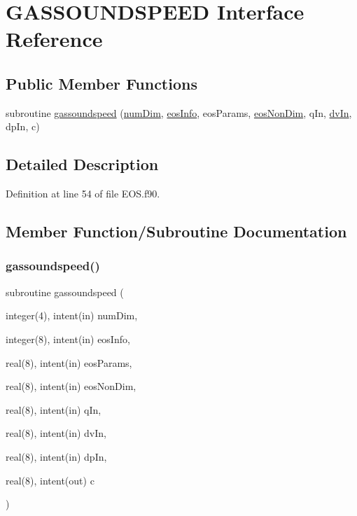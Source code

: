 \hypertarget{interfaceeos_1_1GASSOUNDSPEED}{}\section{G\+A\+S\+S\+O\+U\+N\+D\+S\+P\+E\+ED Interface Reference}
\label{interfaceeos_1_1GASSOUNDSPEED}
\subsection*{Public Member Functions}
\begin{DoxyCompactItemize}
\item 
subroutine \hyperlink{interfaceeos_1_1GASSOUNDSPEED_a065c2a265fbece14aae719242d4bfbd5}{gassoundspeed} (\hyperlink{SATKernels_8H_a680185db8546de161968dabace9e94f1}{num\+Dim}, \hyperlink{WENOKernels_8H_a9b67b225dd1b2bffc0623aa04a80bfc4}{eos\+Info}, eos\+Params, \hyperlink{WENOKernels_8H_ae84c458d3f8dce53d214eabcdc84b623}{eos\+Non\+Dim}, q\+In, \hyperlink{RoeKernels_8H_a24a50bb7f3155b1d6314eec79d33d669}{dv\+In}, dp\+In, c)
\end{DoxyCompactItemize}


\subsection{Detailed Description}


Definition at line 54 of file E\+O\+S.\+f90.



\subsection{Member Function/\+Subroutine Documentation}
\hypertarget{interfaceeos_1_1GASSOUNDSPEED_a065c2a265fbece14aae719242d4bfbd5}{}\label{interfaceeos_1_1GASSOUNDSPEED_a065c2a265fbece14aae719242d4bfbd5} 
\subsubsection{\texorpdfstring{gassoundspeed()}{gassoundspeed()}}
{\footnotesize\ttfamily subroutine gassoundspeed (\begin{DoxyParamCaption}\item[{integer(4), intent(in)}]{num\+Dim,  }\item[{integer(8), intent(in)}]{eos\+Info,  }\item[{real(8), intent(in)}]{eos\+Params,  }\item[{real(8), intent(in)}]{eos\+Non\+Dim,  }\item[{real(8), intent(in)}]{q\+In,  }\item[{real(8), intent(in)}]{dv\+In,  }\item[{real(8), intent(in)}]{dp\+In,  }\item[{real(8), intent(out)}]{c }\end{DoxyParamCaption})}



